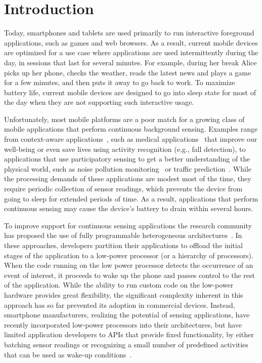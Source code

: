 
\section{\label{sec:Introduction}Introduction}

Today, smartphones and tablets are used primarily to run interactive
foreground applications, such as games and web browsers.  As a result,
current mobile devices are optimized for a use case where applications
are used intermittently during the day, in sessions that last for
several minutes.  For example, during her break Alice picks up
her phone, checks the weather, reads the latest news and plays a
game for a few minutes, and then puts it away to go back to work.  To
maximize battery life, current mobile devices are designed to go
into sleep state for most of the day when they are not supporting such
interactive usage.

Unfortunately, most mobile platforms are a poor match for a growing
class of mobile applications that perform continuous background
sensing.  Examples range from context-aware applications~\cite{baldauf2007survey,hong2009context}, such as
medical applications~\cite{hameed2003application,preuveneers2008mobile,tsai2007usability} that improve our
well-being or even save lives using activity recognition (e.g., fall
detection), to applications that use participatory sensing to get a
better understanding of the physical world, such as noise pollution
monitoring~\cite{maisonneuve2009citizen,maisonneuve2009noisetube} or traffic prediction~\cite{hull2006cartel}.  While the processing demands of
these applications are modest most of the time, they require periodic
collection of sensor readings, which prevents the device from going to
sleep for extended periods of time.  As a result, applications that
perform continuous sensing may cause the device's battery to drain
within several hours.

To improve support for continuous sensing applications the research
community has proposed the use of fully programmable heterogeneous
architectures~\cite{reflex,littlerock,turducken}.  In these
approaches, developers partition their applications to offload the
initial stages of the application to a low-power processor
(or a hierarchy of processors).  When the code running on the low
power processor detects the occurrence of an event of interest, it
proceeds to wake up the phone and passes control to the rest of the
application.  While the ability to run custom code on the low-power
hardware provides great flexibility, the significant complexity
inherent in this approach has so far prevented its adoption in
commercial devices.  Instead, smartphone manufacturers, realizing the
potential of sensing applications, have recently incorporated
low-power processors into their architectures, but have limited
application developers to APIs that provide fixed functionality, by
either batching sensor readings or recognizing a small number of
predefined activities that can be used as wake-up
conditions~\cite{androidMotionSensors,coreMotion,motox}.


